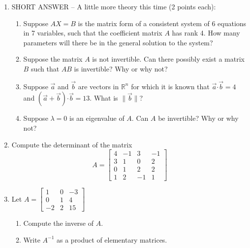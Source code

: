 \documentclass[12pt]{article}
\newcommand{\points}[1]{\marginpar{\hspace{24pt}[#1]}}
\newcommand{\R}{\mathbb{R}}
\newcommand{\len}[1]{\lVert #1\rVert}
\newcommand{\dotp}{\boldsymbol{\cdot}}
\begin{document}
\begin{enumerate}
\item SHORT ANSWER -- A little more theory this time (2 points each):
\begin{enumerate}
 \item Suppose $AX=B$ is the matrix form of a consistent system of 6 equations in 7 variables, such that the coefficient matrix $A$ has rank 4. How many parameters will there be in the general solution to the system?

\vspace{1.75in}

 \item Suppose the matrix $A$ is not invertible. Can there possibly exist a matrix $B$ such that $AB$ is invertible? Why or why not?

\vspace{1.75in}

 \item Suppose $\vec{a}$ and $\vec{b}$ are vectors in $\R^n$ for which it is known that $\vec{a}\dotp \vec{b} = 4$ and $(\vec{a}+\vec{b})\dotp \vec{b} = 13$. What is $\len{\vec{b}}$?

\vspace{1.75in} 

 \item Suppose $\lambda=0$ is an eigenvalue of $A$. Can $A$ be invertible? Why or why not?
\end{enumerate}
\newpage

\item Compute the determinant of the matrix \points{8}
\[
 A = \begin{bmatrix}4&-1&3&-1\\3&1&0&2\\0&1&2&2\\1&2&-1&1\end{bmatrix}
\]

\newpage

\item Let $A=\begin{bmatrix}1&0&-3\\0&1&4\\-2&2&15\end{bmatrix}$
\begin{enumerate}
 \item Compute the inverse of $A$. \points{5}

\vspace{4in}

 \item Write $A^{-1}$ as a product of elementary matrices. \points{3}


\end{enumerate}
\end{enumerate}
\end{document}
